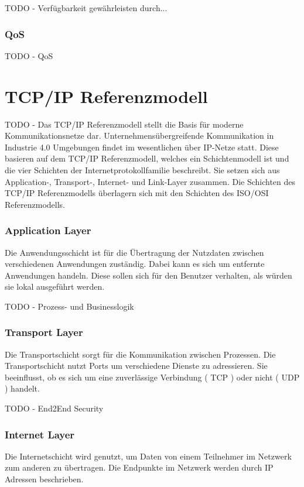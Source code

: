 TODO - Verfügbarkeit gewährleisten durch...

\subsubsection{\ac{QoS}}
TODO - \ac{QoS}

\section{TCP/IP Referenzmodell}
\label{Grundlagen:TCP/IP Referenzmodell}
TODO - Das \ac{TCP}/\ac{IP} Referenzmodell stellt die Basis für moderne Kommunikationsnetze dar.
Unternehmensübergreifende Kommunikation in Industrie 4.0 Umgebungen findet im wesentlichen über IP-Netze statt. Diese basieren auf dem TCP/IP Referenzmodell, welches ein Schichtenmodell ist und die vier Schichten der Internetprotokollfamilie beschreibt. Sie setzen sich aus Application-, Transport-, Internet- und Link-Layer zusammen. Die Schichten des TCP/IP Referenzmodells überlagern sich mit den Schichten des ISO/OSI Referenzmodells. 

\subsubsection{Application Layer}
Die Anwendungsschicht ist für die Übertragung der Nutzdaten zwischen verschiedenen Anwendungen zuständig. Dabei kann es sich um entfernte Anwendungen handeln. Diese sollen sich für den Benutzer verhalten, als würden sie lokal ausgeführt werden.

TODO - Prozess- und Businesslogik

\subsubsection{Transport Layer}
Die Transportschicht sorgt für die Kommunikation zwischen Prozessen. Die Transportschicht nutzt Ports um verschiedene Dienste zu adressieren. Sie beeinflusst, ob es sich um eine zuverlässige Verbindung ( TCP ) oder nicht ( UDP ) handelt.

TODO - End2End Security

\subsubsection{Internet Layer}
Die Internetschicht wird genutzt, um Daten von einem Teilnehmer im Netzwerk zum anderen zu übertragen. Die Endpunkte im Netzwerk werden durch IP Adressen beschrieben.

